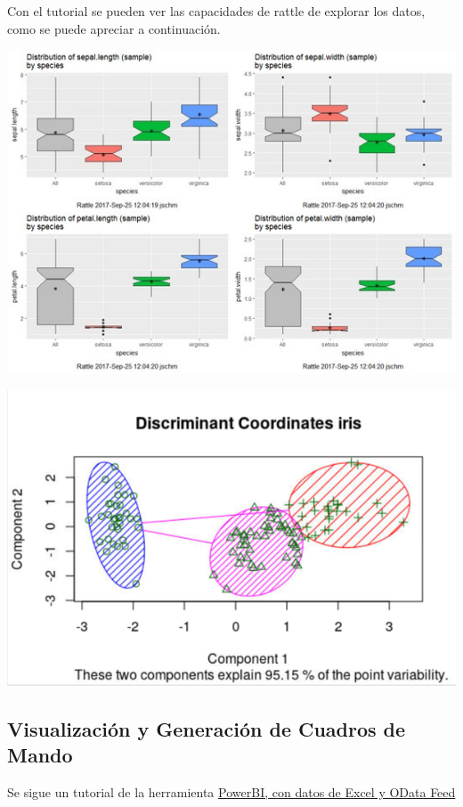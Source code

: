\documentclass[
]{book}
\begin{document}
Con el tutorial se pueden ver las capacidades de rattle de explorar los datos, como se puede apreciar a continuación.

\includegraphics{images/T3-rattle2.png}

\includegraphics{images/T3-rattle3.png}

\hypertarget{visualizaciuxf3n-y-generaciuxf3n-de-cuadros-de-mando}{%
\subsection{Visualización y Generación de Cuadros de Mando}\label{visualizaciuxf3n-y-generaciuxf3n-de-cuadros-de-mando}}

Se sigue un tutorial de la herramienta \href{https://docs.microsoft.com/es-es/power-bi/desktop-tutorial-analyzing-sales-data-from-excel-and-an-odata-feed}{PowerBI, con datos de Excel y OData Feed}
\end{document}
